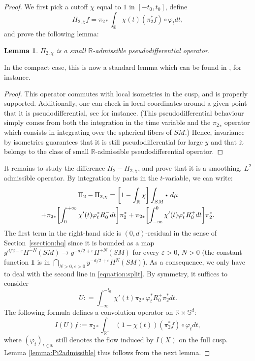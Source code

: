 \documentclass[10pt]{amsart}
\newcommand{\sbullet}{{\scriptscriptstyle\bullet}}
\newcommand{\csbullet}{{\raisebox{1pt}{$\sbullet$}}}
\newcommand{\R}{\mathbb{R}}
\newcommand{\Ss}{\mathbb{S}}
\newcommand{\eps}{\varepsilon}
\theoremstyle{plain}
\newtheorem{lemma}{Lemma}[section]
\theoremstyle{definition}
\begin{document}
\begin{proof}
We first pick a cutoff $\chi$ equal to $1$ in $[-t_0,t_0]$, define
\[
\Pi_{2,\chi} f = \pi_{2\ast}\int_\R \chi(t) (\pi_2^\ast f)\circ\varphi_t dt,
\]
and prove the following lemma:

\begin{lemma}
\label{lemma:admissibility}
$\Pi_{2,\chi}$ is a small $\R$-admissible pseudodifferential operator.
\end{lemma}

In the compact case, this is now a standard lemma which can be found in \cite{Guillarmou-17-1, Gouezel-Lefeuvre-19}, for instance.

\begin{proof}
This operator commutes with local isometries in the cusp, and is properly supported. Additionally, one can check in local coordinates around a given point that it is pseudodifferential, see \cite[\S 2.5]{Lefeuvre-these} for instance. (This pseudodifferential behaviour simply comes from both the integration in the time variable and the ${\pi_2}_*$ operator which consists in integrating over the spherical fibers of $SM$.) Hence, invariance by isometries guarantees that it is still pseudodifferential for large $y$ and that it belongs to the class of small $\R$-admissible pseudodifferential operator.
\end{proof}

It remains to study the difference $\Pi_2 - \Pi_{2,\chi}$, and prove that it is a smoothing, $L^2$ admissible operator. By integration by parts in the $t$-variable, we can write:
\begin{multline}
\label{equation:split}
\Pi_2 - \Pi_{2,\chi}= \biggl[1-\int_\R \chi\biggr] \int_{SM} \csbullet ~d \mu\\
+ \pi_{2\ast}\biggl[\int_0^{+\infty} \chi'(t) \varphi_t^\ast R_0^- dt\biggr]\pi_2^\ast + \pi_{2\ast}\biggl[\int_{-\infty}^0 \chi'(t) \varphi_t^\ast R_0^+ dt\biggr] \pi_2^\ast.
\end{multline}
The first term in the right-hand side is $(0,d)$-residual in the sense of Section~\ref{ssection:hq} since it is bounded as a map $y^{d/2-\eps} H^{-N}(SM) \to y^{-d/2+\eps}H^{+N}(SM)$ for every $\eps > 0$, $N > 0$ (the constant function $\mathbf{1}$ is in $\bigcap_{N > 0, \eps > 0} y^{-d/2+\eps}H^N(SM)$). As a consequence, we only have to deal with the second line in \eqref{equation:split}. By symmetry, it suffices to consider
\[
U : = \int_{-\infty}^{-t_0} \chi'(t) \pi_{2\ast} \varphi_t^\ast R_0^+ \pi_2^\ast dt.
\]
The following formula defines a convolution operator on $\R\times\Ss^d$:
\[
I(U) f := \pi_{2\ast}\int_{\R^-} (1-\chi(t)) (\pi_2^\ast f)\circ \varphi_t dt,
\]
where $(\varphi_t)_{t \in \R}$ still denotes the flow induced by $I(X)$ on the full cusp. Lemma \ref{lemma:Pi2admissible} thus follows from the next lemma.
\end{proof}
\end{document}
